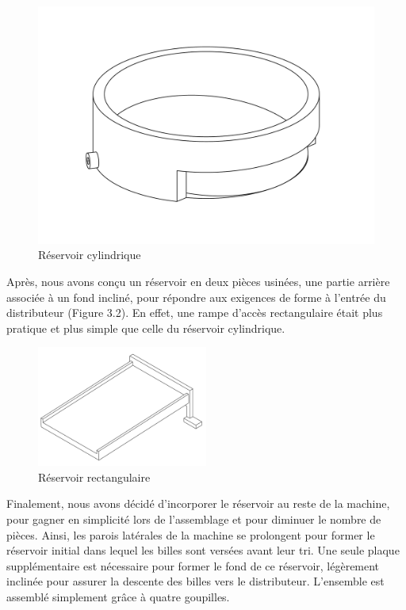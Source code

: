 \begin{figure}
    \centering
    \includegraphics[width=\textwidth]{Graphics/Reservoir_initial/RESERVOIR_CYLINDRIQUE.pdf}
    \caption{Réservoir cylindrique}
\end{figure}

Après, nous avons conçu un réservoir en deux pièces usinées, une partie arrière associée à un fond incliné, pour répondre aux exigences de forme à l'entrée du distributeur (Figure 3.2). En effet, une rampe d'accès rectangulaire était plus pratique et plus simple que celle du réservoir cylindrique.
\begin{figure}
    \centering
    \includegraphics[width=0.5\textwidth]{Graphics/Reservoir_initial/RESERVOIR_CUBE.pdf}
    \caption{Réservoir rectangulaire}
\end{figure}

Finalement, nous avons décidé d'incorporer le réservoir au reste de la machine, pour gagner en simplicité lors de l'assemblage et pour diminuer le nombre de pièces. Ainsi, les parois latérales de la machine se prolongent pour former le réservoir initial dans lequel les billes sont versées avant leur tri. Une seule plaque supplémentaire est nécessaire pour former le fond de ce réservoir, légèrement inclinée pour assurer la descente des billes vers le distributeur. L'ensemble est assemblé simplement grâce à quatre goupilles. 

